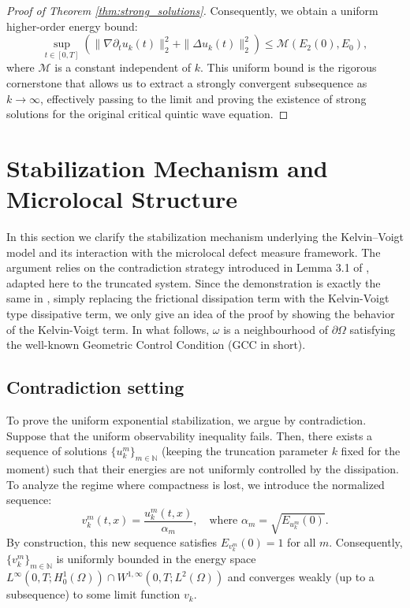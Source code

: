 \documentclass[11pt,letterpaper]{amsart}
\begin{document}
\begin{proof}[Proof of Theorem \ref{thm:strong_solutions}]
Consequently, we obtain a uniform higher-order energy bound:
\begin{equation}\label{eq:uniform_H2_final}
    \sup_{t \in [0,T]} \left( \|\nabla \partial_t u_k(t)\|_2^2 + \|\Delta u_k(t)\|_2^2 \right) \le \mathcal{M}(E_2(0), E_0),
\end{equation}
where $\mathcal{M}$ is a constant independent of $k$. This uniform bound is the rigorous cornerstone that allows us to extract a strongly convergent subsequence as $k \to \infty$, effectively passing to the limit and proving the existence of strong solutions for the original critical quintic wave equation.
\end{proof}


\section{Stabilization Mechanism and Microlocal Structure}

In this section we clarify the stabilization mechanism underlying the
Kelvin--Voigt model and its interaction with the microlocal defect
measure framework. The argument relies on the contradiction strategy
introduced in Lemma 3.1 of \cite{Cavalcanti2024}, adapted here to
the truncated system. Since the demonstration is exactly the same in \cite{Cavalcanti2024}, simply replacing the frictional dissipation term with the Kelvin-Voigt type dissipative term, we only give an idea of the proof by showing the behavior of the Kelvin-Voigt term. In what follows, $\omega$ is a neighbourhood of $\partial \Omega$ satisfying the well-known Geometric Control Condition (GCC in short).

\subsection{Contradiction setting}
To prove the uniform exponential stabilization, we argue by contradiction. Suppose that the uniform observability inequality fails. Then, there exists a sequence of solutions $\{u_k^m\}_{m \in \mathbb{N}}$ (keeping the truncation parameter $k$ fixed for the moment) such that their energies are not uniformly controlled by the dissipation. To analyze the regime where compactness is lost, we introduce the normalized sequence:
\begin{equation}\label{eq:normalized_seq}
    v_k^m(t,x) = \frac{u_k^m(t,x)}{\alpha_m}, \quad \text{where } \alpha_m = \sqrt{E_{u_k^m}(0)}.
\end{equation}
By construction, this new sequence satisfies $E_{v_k^m}(0) = 1$ for all $m$. Consequently, $\{v_k^m\}_{m \in \mathbb{N}}$ is uniformly bounded in the energy space $L^\infty(0,T; H^1_0(\Omega)) \cap W^{1,\infty}(0,T; L^2(\Omega))$ and converges weakly (up to a subsequence) to some limit function $v_k$.
\end{document}
